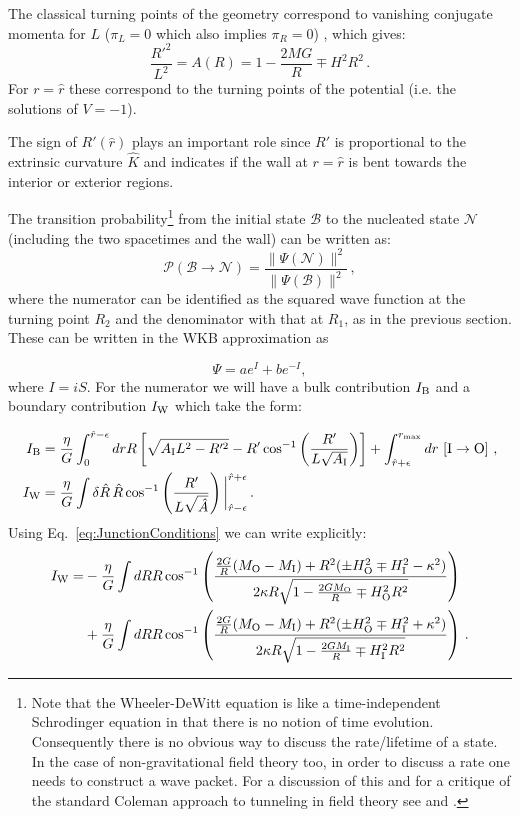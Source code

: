 \documentclass[a4paper,11pt]{article}
\numberwithin{equation}{section}
\newcommand{\be}{\begin{equation}}
\newcommand{\ee}{\end{equation}}
\numberwithin{equation}{section}
\begin{document}
The classical turning points of the geometry correspond to vanishing conjugate momenta for $L$ ($\pi_L=0$ which also implies $\pi_R=0$) \cite{Fischler:1989se}, which gives:
\be
\label{eq:TurningPoints}
\frac{R'^{2}}{L^{2}} = A(R) = 1-\frac{2MG}{R}\mp H^{2}R^{2} \,.
\ee
For $r=\hat r$ these correspond to the turning points of the potential (i.e. the solutions of $V=-1$).

The sign of $R'(\hat r)$ plays an important role since $R'$ is proportional to the extrinsic curvature $\hat K$ and indicates if the wall at $r=\hat r$ is bent towards the interior or exterior regions.


The transition probability\footnote{Note that the Wheeler-DeWitt equation is like a time-independent Schrodinger equation in that there is no notion of time evolution. Consequently there is no obvious way to discuss the rate/lifetime of a state. In the case of non-gravitational field theory too, in order to discuss a rate one needs to construct a wave packet. For a discussion of this and for a critique of the standard Coleman approach to tunneling in field theory see \cite{Andreassen:2016cvx} and \cite{deAlwis:2023gth}. } from the initial state $\mathcal{B}$ to the nucleated state $\mathcal{N}$ (including the two spacetimes and the wall) can be written as:
\be
{\mathcal P}\left(\mathcal{B}\rightarrow \mathcal{N}\right)=\frac{\|\Psi(\mathcal{N})\|^2}{\|\Psi(\mathcal{B})\|^2} \,,
\ee
where the numerator can be identified as the squared wave function at the turning point $R_2$ and the denominator with that at $R_1$, as in the previous section.
These can be written in the WKB approximation as

\be
\Psi=a e^I + b e^{-I}, \label{eq:PsiR0}
\ee
 where $I=iS$. For the numerator we will have a bulk contribution $I_{\rm B}$ and a boundary contribution $I_{\rm W}$ which take the form:

\begin{align}
\label{eq:SclassicalBulk}
I_{{\rm B}} & = \frac{\eta}{G}\int_{0}^{\hat{r}-\epsilon}drR\left[ \sqrt{A_{{\rm I}}L^{2}-R'^{2}}-R'\cos^{-1}\left(\frac{R'}{L\sqrt{A_{{\rm I}}}}\right)\right] + \int_{\hat{r}+\epsilon}^{r_{\rm max}}dr \,\left[{\rm I}\rightarrow{\rm O}\right] \,, \\
\label{eq:SclassicalBoundary}
I_{{\rm W}} & = \frac{\eta}{G}\int\delta\hat{R} \, \hat{R}\cos^{-1}\left(\frac{R'}{L\sqrt{\hat{A}}}\right)\bigg|_{\hat{r}-\epsilon}^{\hat{r}+\epsilon} \,.
\end{align}
Using Eq.~\eqref{eq:JunctionConditions} we can write explicitly:
\begin{align}
\label{eq:Integrals}
I_{\rm W} = &- \frac{\eta}{G}\int dR R \cos^{-1} \left(\frac{\frac{2G}{R}(M_{\rm O} - M_{\rm I}) + R^2(\pm H_{\rm O}^2 \mp H_{\rm I}^2 - \kappa^2)}{2 \kappa R \sqrt{1 - \frac{2GM_{\rm O}}{R} \mp H_{\rm O}^2 R^2}}\right)  \nonumber \\
&+ \frac{\eta}{G}\int dR R \cos^{-1} \left(\frac{\frac{2G}{R}(M_{\rm O} - M_{\rm I}) + R^2 (\pm H_{\rm O}^2 \mp  H_{\rm I}^2 + \kappa^2)}{2 \kappa R \sqrt{1 - \frac{2GM_{\rm I}}{R} \mp H_{\rm I}^2 R^2}}\right) \,.
\end{align}
\end{document}
